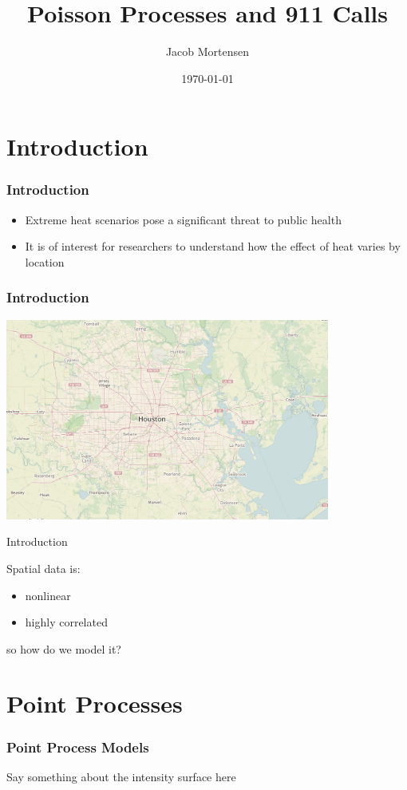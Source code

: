 \documentclass[10pt, compress]{beamer}
\title{Poisson Processes and 911 Calls}
\subtitle{}
\date{\today}
\author{Jacob Mortensen}
\institute{Brigham Young University}
\begin{document}
  \maketitle
  
  \section{Introduction}
  \begin{frame}
    \frametitle{Introduction}
    \begin{itemize}
      \item Extreme heat scenarios pose a significant threat to public health
      \item It is of interest for researchers to understand how the effect of heat varies by location
    \end{itemize}
  \end{frame}
  \begin{frame}
    \frametitle{Introduction}
    \centering
    \includegraphics[width=0.8\textwidth]{houston_map.jpg}
  \end{frame}
  \begin{frame}{Introduction}
    \centering
    \begin{minipage}{0.8\textwidth}
      Spatial data is:
      \begin{itemize}
        \item nonlinear
        \item highly correlated
      \end{itemize}
    so how do we model it?
    \end{minipage}
  \end{frame}
  \section{Point Processes}
  \begin{frame}
    \frametitle{Point Process Models}
     
    Say something about the intensity surface here
  \end{frame}
\end{document}
